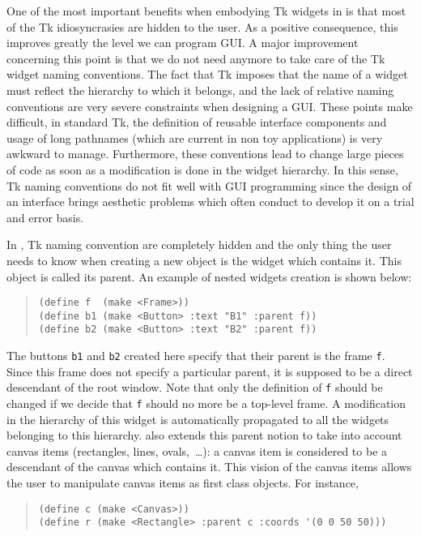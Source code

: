 {One of the most important benefits when embodying Tk widgets in {\stklos}
is that most of the Tk idiosyncrasies are hidden to the user. As a positive
consequence, this improves greatly the level we can program GUI. A
major improvement concerning this point is that we do not need anymore to
take care of the Tk widget naming conventions. The fact that Tk imposes
that the name of a widget must reflect the hierarchy to which it belongs,
and the lack of relative naming conventions are very severe constraints
when designing a GUI. These points make difficult, in standard Tk, the
definition of reusable interface components and usage of long pathnames
(which are current in non toy applications) is very awkward to
manage. Furthermore, these conventions lead to change large pieces of code
as soon as a modification is done in the widget hierarchy. In this sense,
Tk naming conventions do not fit well with GUI programming since the design
of an interface brings aesthetic problems which often conduct to develop it
on a trial and error basis.

In {\stklos}, Tk naming convention are completely hidden and the only
thing the user needs to know when creating a new object is the widget
which contains it. This object is called its parent. An example of
nested widgets creation is shown below:

\begin{quote}\figsize
\begin{verbatim}
(define f  (make <Frame>))
(define b1 (make <Button> :text "B1" :parent f))
(define b2 (make <Button> :text "B2" :parent f))
\end{verbatim}
\end{quote}

\noindent
The buttons {\tt b1} and {\tt b2} created here specify that their parent
is the frame {\tt f}. Since this frame does not specify a particular
parent, it is supposed to be a direct descendant of the root
window. Note that only the definition of {\tt f} should be changed if
we decide that {\tt f} should no more be a top-level frame. A
modification in the hierarchy of this widget is automatically
propagated to all the widgets belonging to this hierarchy.  {\stklos}
also extends this parent notion to take into account canvas items
(rectangles, lines, ovals,~\ldots): a canvas item is considered to be
a descendant of the canvas which contains it. This vision of the
canvas items allows the {\stklos} user to manipulate canvas items as
first class objects. For instance,

\begin{quote}\figsize
\begin{verbatim}
(define c (make <Canvas>))
(define r (make <Rectangle> :parent c :coords '(0 0 50 50)))
\end{verbatim}
\end{quote}


}
